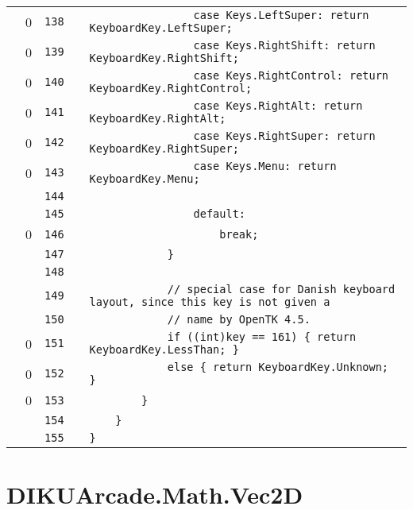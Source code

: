 \documentclass[a4paper,landscape,10pt]{article}
\begin{document}
\begin{longtable}[l]{lrrll}
\cellcolor{red} & 0 & \verb~138~ & & \verb~                case Keys.LeftSuper: return KeyboardKey.LeftSuper;~\\
\cellcolor{red} & 0 & \verb~139~ & & \verb~                case Keys.RightShift: return KeyboardKey.RightShift;~\\
\cellcolor{red} & 0 & \verb~140~ & & \verb~                case Keys.RightControl: return KeyboardKey.RightControl;~\\
\cellcolor{red} & 0 & \verb~141~ & & \verb~                case Keys.RightAlt: return KeyboardKey.RightAlt;~\\
\cellcolor{red} & 0 & \verb~142~ & & \verb~                case Keys.RightSuper: return KeyboardKey.RightSuper;~\\
\cellcolor{red} & 0 & \verb~143~ & & \verb~                case Keys.Menu: return KeyboardKey.Menu;~\\
\cellcolor{gray} &  & \verb~144~ & & \verb~~\\
\cellcolor{gray} &  & \verb~145~ & & \verb~                default:~\\
\cellcolor{red} & 0 & \verb~146~ & & \verb~                    break;~\\
\cellcolor{gray} &  & \verb~147~ & & \verb~            }~\\
\cellcolor{gray} &  & \verb~148~ & & \verb~~\\
\cellcolor{gray} &  & \verb~149~ & & \verb~            // special case for Danish keyboard layout, since this key is not given a~\\
\cellcolor{gray} &  & \verb~150~ & & \verb~            // name by OpenTK 4.5.~\\
\cellcolor{red} & 0 & \verb~151~ & & \verb~            if ((int)key == 161) { return KeyboardKey.LessThan; }~\\
\cellcolor{red} & 0 & \verb~152~ & & \verb~            else { return KeyboardKey.Unknown; }~\\
\cellcolor{red} & 0 & \verb~153~ & & \verb~        }~\\
\cellcolor{gray} &  & \verb~154~ & & \verb~    }~\\
\cellcolor{gray} &  & \verb~155~ & & \verb~}~\\
\end{longtable}
\newpage
\section{DIKUArcade.Math.Vec2D}
\end{document}

